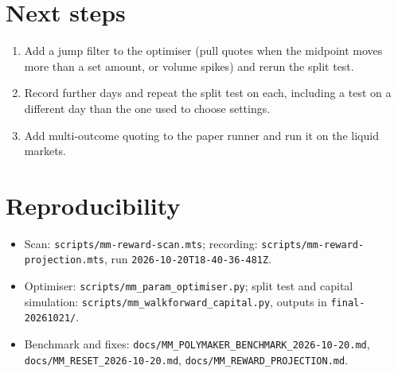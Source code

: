 \documentclass[11pt,a4paper]{article}
\begin{document}
\section{Next steps}
\begin{enumerate}[leftmargin=1.5em]
  \item Add a jump filter to the optimiser (pull quotes when the midpoint moves more than a set amount, or volume spikes) and rerun the split test.
  \item Record further days and repeat the split test on each, including a test on a different day than the one used to choose settings.
  \item Add multi-outcome quoting to the paper runner and run it on the liquid markets.
\end{enumerate}

\section*{Reproducibility}
\small
\begin{itemize}[leftmargin=1.2em]
  \item Scan: \texttt{scripts/mm-reward-scan.mts}; recording: \texttt{scripts/mm-reward-projection.mts}, run \texttt{2026-10-20T18-40-36-481Z}.
  \item Optimiser: \texttt{scripts/mm\_param\_optimiser.py}; split test and capital simulation: \texttt{scripts/mm\_walkforward\_capital.py}, outputs in \texttt{final-20261021/}.
  \item Benchmark and fixes: \texttt{docs/MM\_POLYMAKER\_BENCHMARK\_2026-10-20.md}, \texttt{docs/MM\_RESET\_2026-10-20.md}, \texttt{docs/MM\_REWARD\_PROJECTION.md}.
\end{itemize}
\end{document}
